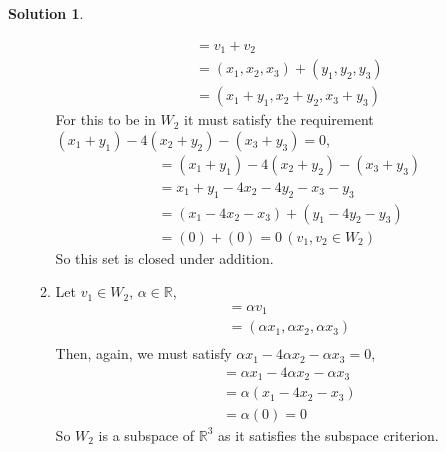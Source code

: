 \documentclass[10pt]{article}
\theoremstyle{definition}
\newtheorem{soln}{Solution}
\begin{document}
\begin{soln}
\begin{enumerate}[label=(\alph*)]
\begin{enumerate}[label=(\roman*)]
    \begin{align*}
      & = v_1+v_2\\
      & = (x_1,x_2,x_3)+(y_1,y_2,y_3)\\
      & = (x_1+y_1,x_2+y_2,x_3+y_3)
    \end{align*}
    For this to be in $W_2$ it must satisfy the requirement $(x_1+y_1)-4(x_2+y_2)-(x_3+y_3)=0$,
    \begin{align*}
      & = (x_1+y_1)-4(x_2+y_2)-(x_3+y_3) \\
      & = x_1+y_1-4x_2-4y_2-x_3-y_3 \\
      & = (x_1-4x_2-x_3)+(y_1-4y_2-y_3) \\
      & = (0)+(0)=0 \, (v_1,v_2\in W_2)
    \end{align*}
    So this set is closed under addition.
    \item Let $v_1\in W_2$, $\alpha\in\mathbb{R}$,
    \begin{align*}
      & = \alpha v_1\\
      & = (\alpha x_1,\alpha x_2,\alpha x_3)\\
    \end{align*}
    Then, again, we must satisfy $\alpha x_1-4\alpha x_2-\alpha x_3=0$,
    \begin{align*}
      & = \alpha x_1-4\alpha x_2-\alpha x_3 \\
      & = \alpha(x_1-4 x_2- x_3) \\
      & = \alpha(0)=0
    \end{align*}
    So $W_2$ is a subspace of $\mathbb{R}^3$ as it satisfies the subspace criterion.
  \end{enumerate}
\end{enumerate}
\end{soln}
\end{document}
